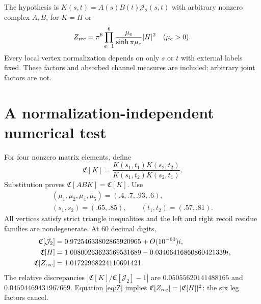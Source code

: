 \documentclass[11pt,a4paper]{article}
\newcommand{\J}{\mathcal J_2}
\newcommand{\CR}{\mathfrak C}
\begin{document}
The hypothesis is $K(s,t)=A(s)B(t)\J(s,t)$ with arbitrary
nonzero complex $A,B$, for $K=H$ or
\begin{equation}
 Z_{\rm rec}=\pi^6\prod_{e=1}^6\frac{\mu_e}{\sinh\pi\mu_e}|H|^2
 \quad(\mu_e>0).\label{eq:Z}
\end{equation}
Every local vertex normalization depends on only $s$ or $t$
with external labels fixed. These factors and absorbed channel
measures are included; arbitrary joint factors are not.

\newpage
\section{A normalization-independent numerical test}
For four nonzero matrix elements, define
\begin{equation}
 \CR[K]=\frac{K(s_1,t_1)K(s_2,t_2)}
 {K(s_1,t_2)K(s_2,t_1)}.
\end{equation}
Substitution proves $\CR[ABK]=\CR[K]$. Use
\begin{equation}
 \begin{gathered}
 (\mu_1,\mu_2,\mu_4,\mu_5)=(.4,.7,.93,.6),\\
 (s_1,s_2)=(.65,.85),\qquad(t_1,t_2)=(.57,.81).
 \end{gathered}
\end{equation}
All vertices satisfy strict triangle inequalities and the left
and right recoil residue families are nondegenerate.
At 60 decimal digits,
\begin{align}
 \CR[\J]&=0.97254633802865920965+O(10^{-60})i,\\
 \CR[H]&=1.00800263623569531689-0.03406416860860421339i,\\
 \CR[Z_{\rm rec}]&=1.01722968224110691421.
\end{align}
The relative discrepancies $|\CR[K]/\CR[\J]-1|$ are
$0.05055620141488165$ and $0.04594469431967669$.
Equation \eqref{eq:Z} implies $\CR[Z_{\rm rec}]=|\CR[H]|^2$:
the six leg factors cancel.
\end{document}
